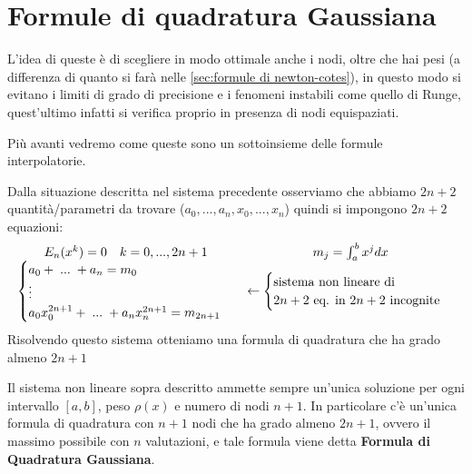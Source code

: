 \documentclass[12pt,a4paper,]{report}
\newcommand{\s}{\hspace{1mm}}
\begin{document}
\section{Formule di quadratura Gaussiana}
L'idea di queste è di scegliere in modo ottimale anche i nodi, oltre che hai pesi (a differenza di quanto si farà nelle \autoref{sec:formule di newton-cotes}), in questo modo si evitano i limiti di grado di precisione e i fenomeni instabili come quello di Runge, quest'ultimo infatti si verifica proprio in presenza di nodi equispaziati.
\begin{nota}
    Più avanti vedremo come queste sono un sottoinsieme delle formule interpolatorie.
\end{nota}
Dalla situazione descritta nel sistema precedente osserviamo che abbiamo $2n+2$ quantità/parametri da trovare ($a_0,...,a_n,x_0,...,x_n$) quindi si impongono $2n+2$ equazioni:
\[
\begin{array}{cc}
    E_n(x^k) =0 \quad k=0,...,2n+1 & m_j= \int_a^bx^jdx \\
    \begin{cases}
        a_0 + \s...\s +a_n = m_0 \\
        \vdots \\
        a_0x_0^{2n+1} +\s ...\s + a_nx_n^{2n+1} = m_{2n+1}
    \end{cases} & \leftarrow \begin{cases}
        \text{sistema non lineare di} \\
        \text{$2n+2$ eq. in $2n+2$ incognite}
    \end{cases}
\end{array}
\]
Risolvendo questo sistema otteniamo una formula di quadratura che ha grado almeno $2n+1$
\begin{teorema}
    Il sistema non lineare sopra descritto ammette sempre un'unica soluzione per ogni intervallo $[a,b]$, peso $\rho(x)$ e numero di nodi $n+1$.
    In particolare c'è un'unica formula di quadratura con $n+1$ nodi che ha grado almeno $2n+1$, ovvero il massimo possibile con $n$ valutazioni, e tale formula viene detta \textbf{Formula di Quadratura Gaussiana}.
\end{teorema}
\end{document}
